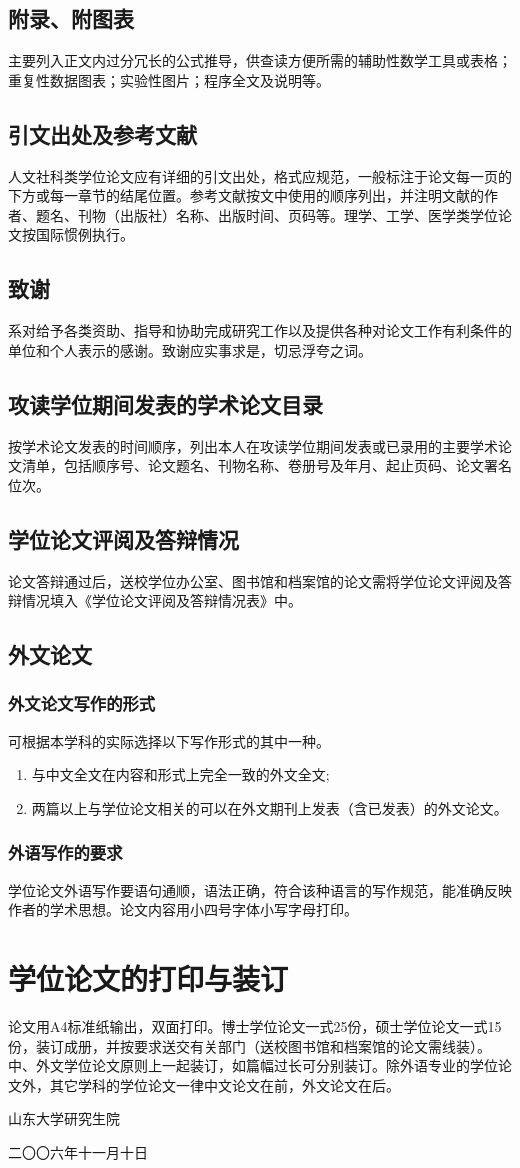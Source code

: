 \documentclass{sduthesis}
\begin{document}
\subsection{附录、附图表}
主要列入正文内过分冗长的公式推导，供查读方便所需的辅助性数学工具或表格；重复性数据图表；实验性图片；程序全文及说明等。
\subsection{引文出处及参考文献}
人文社科类学位论文应有详细的引文出处，格式应规范，一般标注于论文每一页的下方或每一章节的结尾位置。参考文献按文中使用的顺序列出，并注明文献的作者、题名、刊物（出版社）名称、出版时间、页码等。理学、工学、医学类学位论文按国际惯例执行。
\subsection{致谢}
系对给予各类资助、指导和协助完成研究工作以及提供各种对论文工作有利条件的单位和个人表示的感谢。致谢应实事求是，切忌浮夸之词。
\subsection{攻读学位期间发表的学术论文目录}
按学术论文发表的时间顺序，列出本人在攻读学位期间发表或已录用的主要学术论文清单，包括顺序号、论文题名、刊物名称、卷册号及年月、起止页码、论文署名位次。
\subsection{学位论文评阅及答辩情况}
论文答辩通过后，送校学位办公室、图书馆和档案馆的论文需将学位论文评阅及答辩情况填入《学位论文评阅及答辩情况表》中。
\subsection{外文论文}
\subsubsection{外文论文写作的形式}
可根据本学科的实际选择以下写作形式的其中一种。
\begin{enumerate}
\item 与中文全文在内容和形式上完全一致的外文全文;
\item 两篇以上与学位论文相关的可以在外文期刊上发表（含已发表）的外文论文。
\end{enumerate}
\subsubsection{外语写作的要求}
学位论文外语写作要语句通顺，语法正确，符合该种语言的写作规范，能准确反映作者的学术思想。论文内容用小四号字体小写字母打印。
\section{学位论文的打印与装订}
论文用A4标准纸输出，双面打印。博士学位论文一式25份，硕士学位论文一式15份，装订成册，并按要求送交有关部门（送校图书馆和档案馆的论文需线装）。中、外文学位论文原则上一起装订，如篇幅过长可分别装订。除外语专业的学位论文外，其它学科的学位论文一律中文论文在前，外文论文在后。
\vfill
\hfill\begin{minipage}{.3\textwidth}
山东大学研究生院

二〇〇六年十一月十日
\end{minipage}
\listoffigures
\end{document}
